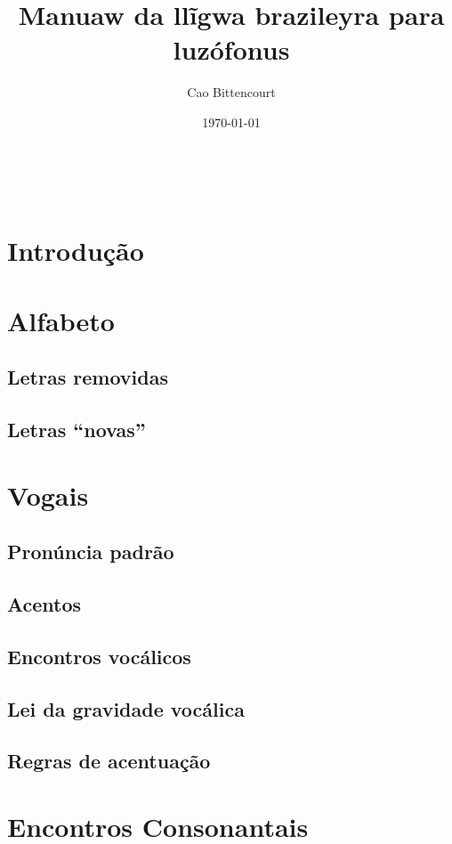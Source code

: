 \documentclass[12pt, a4paper]{article}
\title{Manuaw da llĩgwa brazileyra para luzófonus}
\author{Cao Bittencourt}
\date{\today}
\begin{document}
\thispagestyle{empty}
\maketitle

\newpage \
\thispagestyle{empty}

\newpage
\begin{bilingualpages}
    \rightpage
    \section{Introdução}
    
    \newpage
    \section{Alfabeto}
    \AbcPtBr
    
    \subsection{Letras removidas}
    \subsection{Letras ``novas''}
    
    \section{Vogais}
    \subsection{Pronúncia padrão}
    \subsection{Acentos}
    \subsection{Encontros vocálicos}
    \subsection{Lei da gravidade vocálica}
    \subsection{Regras de acentuação}
    
    \section{Encontros Consonantais}
    

\end{bilingualpages}
\end{document}

